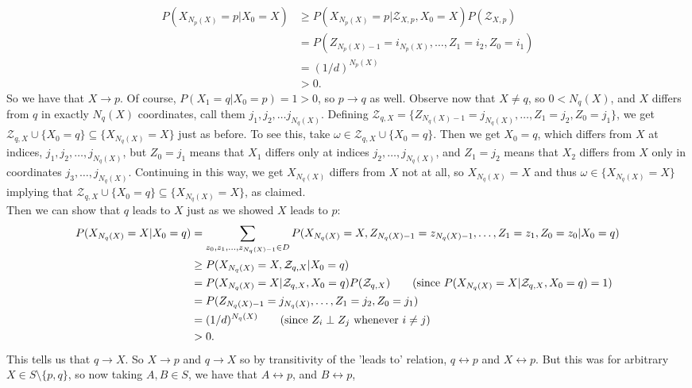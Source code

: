 \documentclass[11pt, letterpaper]{article}
\newcommand{\mc}[1]{\mathcal{#1}}
\begin{document}
    \begin{align*}
        P(X_{N_p(X)}=p|X_0=X)&\geq P(X_{N_p(X)}=p|\mc{Z}_{X,p},X_0=X)P(\mc{Z}_{X,p})\\
        &=P(Z_{N_p(X)-1}=i_{N_p(X)},\dots,Z_1=i_2,Z_0=i_1)\\
        &=\left(1/d\right)^{N_p(X)}\tag{since $Z_i\perp Z_j$ whenever $i\neq j$}\\
        &>0.
    \end{align*}
    So we have that $X\longrightarrow p$. Of course, $P(X_1=q|X_0=p)=1>0$, so $p\longrightarrow q$ as well. Observe now that $X\neq q$, so $0<N_q(X)$, and $X$ differs from $q$ in exactly $N_q(X)$ coordinates,
    call them $j_1,j_2,\dots j_{N_q(X)}$. Defining $\mc{Z}_{q,X}=\{Z_{N_q(X)-1}=j_{N_q(X)},\dots,Z_1=j_2,Z_0=j_1\}$, we get $\mc{Z}_{q,X}\cup\{X_0=q\}\subseteq \{X_{N_q(X)}=X\}$ just as before. To see this, take $\omega\in\mc{Z}_{q,X}\cup\{X_0=q\}$. Then we get
    $X_0=q$, which differs from $X$ at indices, $j_1,j_2,\dots,j_{N_q(X)}$, but $Z_0=j_1$ means that $X_1$ differs only at indices $j_2,\dots,j_{N_q(X)}$, and $Z_1=j_2$ means that $X_2$ differs from $X$ only in coordinates $j_3,\dots,j_{N_q(X)}$. Continuing in this way, we get
    $X_{N_q(X)}$ differs from $X$ not at all, so $X_{N_q(X)}=X$  and thus $\omega\in \{X_{N_q(X)}=X\}$ implying that $\mc{Z}_{q,X}\cup\{X_0=q\}\subseteq\{X_{N_q(X)}=X\}$, as claimed.\\[10pt]
    Then we can show that $q$ leads to $X$ just as we showed $X$ leads to $p$:
    \begin{align*}
        P(X_{N_q(X)}=X|X_0=q)&=\sum_{z_0,z_1,\dots,z_{N_q(X)-1}\in D}P(X_{N_q(X)}=X,Z_{N_q(X)-1}=z_{N_q(X)-1},\dots,Z_1=z_1,Z_0=z_0|X_0=q)\\
        &\geq P(X_{N_q(X)}=X,\mc{Z}_{q,X}|X_0=q)\\
        &=P(X_{N_q(X)}=X|\mc{Z}_{q,X},X_0=q)P(\mc{Z}_{q,X})\tag{since $P(X_{N_q(X)}=X|\mc{Z}_{q,X},X_0=q)=1$}\\
        &=P(Z_{N_q(X)-1}=j_{N_q(X)},\dots,Z_1=j_2,Z_0=j_1)\\
        &=(1/d)^{N_q(X)}\tag{since $Z_i\perp Z_j$ whenever $i\neq j$}\\
        &>0.
    \end{align*}
    This tells us that $q\longrightarrow X$. So $X\longrightarrow p$ and $q\longrightarrow X$ so by transitivity of the 'leads to' relation, $q\longleftrightarrow p$ and $X\longleftrightarrow p$. But this was for arbitrary $X\in S\setminus\{p,q\}$, so now taking $A,B\in S$, we have that $A\longleftrightarrow p$, and $B\longleftrightarrow p$,
\end{document}
